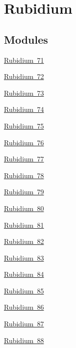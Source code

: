 \hypertarget{group___isotope_const-_rubidium}{}\section{Rubidium}
\label{group___isotope_const-_rubidium}
\subsection*{Modules}
\begin{DoxyCompactItemize}
\item 
\mbox{\hyperlink{group___isotope_const-_rubidium-_rb71}{Rubidium 71}}
\item 
\mbox{\hyperlink{group___isotope_const-_rubidium-_rb72}{Rubidium 72}}
\item 
\mbox{\hyperlink{group___isotope_const-_rubidium-_rb73}{Rubidium 73}}
\item 
\mbox{\hyperlink{group___isotope_const-_rubidium-_rb74}{Rubidium 74}}
\item 
\mbox{\hyperlink{group___isotope_const-_rubidium-_rb75}{Rubidium 75}}
\item 
\mbox{\hyperlink{group___isotope_const-_rubidium-_rb76}{Rubidium 76}}
\item 
\mbox{\hyperlink{group___isotope_const-_rubidium-_rb77}{Rubidium 77}}
\item 
\mbox{\hyperlink{group___isotope_const-_rubidium-_rb78}{Rubidium 78}}
\item 
\mbox{\hyperlink{group___isotope_const-_rubidium-_rb79}{Rubidium 79}}
\item 
\mbox{\hyperlink{group___isotope_const-_rubidium-_rb80}{Rubidium 80}}
\item 
\mbox{\hyperlink{group___isotope_const-_rubidium-_rb81}{Rubidium 81}}
\item 
\mbox{\hyperlink{group___isotope_const-_rubidium-_rb82}{Rubidium 82}}
\item 
\mbox{\hyperlink{group___isotope_const-_rubidium-_rb83}{Rubidium 83}}
\item 
\mbox{\hyperlink{group___isotope_const-_rubidium-_rb84}{Rubidium 84}}
\item 
\mbox{\hyperlink{group___isotope_const-_rubidium-_rb85}{Rubidium 85}}
\item 
\mbox{\hyperlink{group___isotope_const-_rubidium-_rb86}{Rubidium 86}}
\item 
\mbox{\hyperlink{group___isotope_const-_rubidium-_rb87}{Rubidium 87}}
\item 
\mbox{\hyperlink{group___isotope_const-_rubidium-_rb88}{Rubidium 88}}

\end{DoxyCompactItemize}
